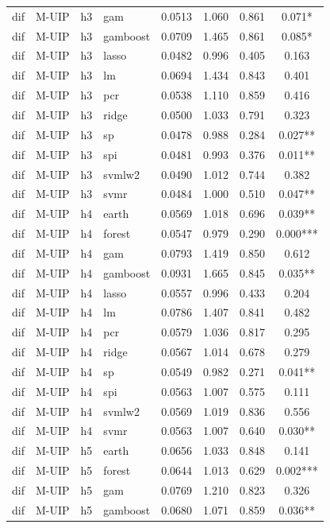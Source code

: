 \begin{ThreePartTable}
\begin{longtable}[t]{llclcccc}
dif & M-UIP & h3 & gam & 0.0513 & 1.060 & 0.861 & 0.071*\\
dif & M-UIP & h3 & gamboost & 0.0709 & 1.465 & 0.861 & 0.085*\\
dif & M-UIP & h3 & lasso & 0.0482 & 0.996 & 0.405 & 0.163\\
dif & M-UIP & h3 & lm & 0.0694 & 1.434 & 0.843 & 0.401\\
dif & M-UIP & h3 & pcr & 0.0538 & 1.110 & 0.859 & 0.416\\
dif & M-UIP & h3 & ridge & 0.0500 & 1.033 & 0.791 & 0.323\\
dif & M-UIP & h3 & sp & 0.0478 & 0.988 & 0.284 & 0.027**\\
dif & M-UIP & h3 & spi & 0.0481 & 0.993 & 0.376 & 0.011**\\
dif & M-UIP & h3 & svmlw2 & 0.0490 & 1.012 & 0.744 & 0.382\\
dif & M-UIP & h3 & svmr & 0.0484 & 1.000 & 0.510 & 0.047**\\
\addlinespace
dif & M-UIP & h4 & earth & 0.0569 & 1.018 & 0.696 & 0.039**\\
dif & M-UIP & h4 & forest & 0.0547 & 0.979 & 0.290 & 0.000***\\
dif & M-UIP & h4 & gam & 0.0793 & 1.419 & 0.850 & 0.612\\
dif & M-UIP & h4 & gamboost & 0.0931 & 1.665 & 0.845 & 0.035**\\
dif & M-UIP & h4 & lasso & 0.0557 & 0.996 & 0.433 & 0.204\\
dif & M-UIP & h4 & lm & 0.0786 & 1.407 & 0.841 & 0.482\\
dif & M-UIP & h4 & pcr & 0.0579 & 1.036 & 0.817 & 0.295\\
dif & M-UIP & h4 & ridge & 0.0567 & 1.014 & 0.678 & 0.279\\
dif & M-UIP & h4 & sp & 0.0549 & 0.982 & 0.271 & 0.041**\\
dif & M-UIP & h4 & spi & 0.0563 & 1.007 & 0.575 & 0.111\\
dif & M-UIP & h4 & svmlw2 & 0.0569 & 1.019 & 0.836 & 0.556\\
dif & M-UIP & h4 & svmr & 0.0563 & 1.007 & 0.640 & 0.030**\\
\addlinespace
dif & M-UIP & h5 & earth & 0.0656 & 1.033 & 0.848 & 0.141\\
dif & M-UIP & h5 & forest & 0.0644 & 1.013 & 0.629 & 0.002***\\
dif & M-UIP & h5 & gam & 0.0769 & 1.210 & 0.823 & 0.326\\
dif & M-UIP & h5 & gamboost & 0.0680 & 1.071 & 0.859 & 0.036**\\

\end{longtable}
\end{ThreePartTable}
